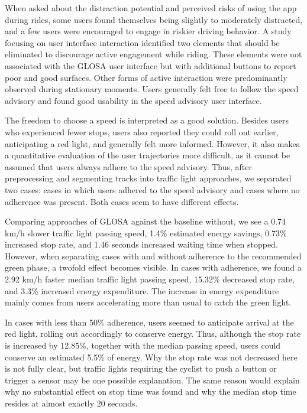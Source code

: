 \begin{Summary}
When asked about the distraction potential and perceived risks of using the app during rides, some users found themselves being slightly to moderately distracted, and a few users were encouraged to engage in riskier driving behavior. A study focusing on user interface interaction identified two elements that should be eliminated to discourage active engagement while riding. These elements were not associated with the GLOSA user interface but with additional buttons to report poor and good surfaces. Other forms of active interaction were predominantly observed during stationary moments. Users generally felt free to follow the speed advisory and found good usability in the speed advisory user interface. 

The freedom to choose a speed is interpreted as a good solution. Besides users who experienced fewer stops, users also reported they could roll out earlier, anticipating a red light, and generally felt more informed. However, it also makes a quantitative evaluation of the user trajectories more difficult, as it cannot be assumed that users always adhere to the speed advisory. Thus, after preprocessing and segmenting tracks into traffic light approaches, we separated two cases: cases in which users adhered to the speed advisory and cases where no adherence was present. Both cases seem to have different effects.

Comparing approaches of GLOSA against the baseline without, we see a 0.74 km/h slower traffic light passing speed, 1.4\% estimated energy savings, 0.73\% increased stop rate, and 1.46 seconds increased waiting time when stopped. However, when separating cases with and without adherence to the recommended green phase, a twofold effect becomes visible. In cases with adherence, we found a 2.92 km/h faster median traffic light passing speed, 15.32\% decreased stop rate, and 3.3\% increased energy expenditure. The increase in energy expenditure mainly comes from users accelerating more than usual to catch the green light. 

In cases with less than 50\% adherence, users seemed to anticipate arrival at the red light, rolling out accordingly to conserve energy. Thus, although the stop rate is increased by 12.85\%, together with the median passing speed, users could conserve an estimated 5.5\% of energy. Why the stop rate was not decreased here is not fully clear, but traffic lights requiring the cyclist to push a button or trigger a sensor may be one possible explanation. The same reason would explain why no substantial effect on stop time was found and why the median stop time resides at almost exactly 20 seconds. 


\end{Summary}
